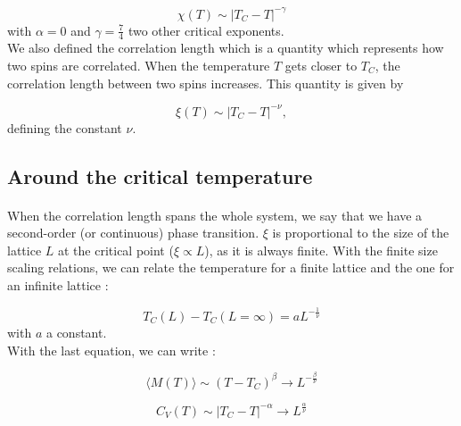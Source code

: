 \documentclass[a4paper, twoside, 11pt]{report}
\theoremstyle{theorem}
\theoremstyle{remark}
\theoremstyle{exemple}
\begin{document}
                \begin{equation*}
                    \chi(T) \sim |T_C - T |^{-\gamma}
                \end{equation*}
            with $\displaystyle \alpha = 0$ and $\displaystyle \gamma=\frac{7}{4}$ two other critical exponents.\\
            We also defined the correlation length which is a quantity which represents how two spins are correlated. When the temperature $T$ gets closer to $T_C$, the correlation length between two spins increases. This quantity is given by 
            
                \begin{equation*}
                    \xi (T) \sim |T_C - T |^{-\nu},
                \end{equation*}
            defining the constant $\nu$.
            
        \subsection{Around the critical temperature}            
            
            \paragraph{}When the correlation length spans the whole system, we say that we have a second-order (or continuous) phase transition. $\xi$ is proportional to the size of the lattice $L$ at the critical point ($\xi \propto L$), as it is always finite. With the finite size scaling relations, we can relate the temperature for a finite lattice and the one for an infinite lattice :
            
                \begin{equation*}
                    T_C(L) - T_C (L=\infty) = aL^{-\frac{1}{\nu}}
                \end{equation*}
            with $a$ a constant.\\
            With the last equation, we can write :
            
                \begin{equation*}
                    \langle M(T) \rangle \sim (T-T_C)^{\beta} \rightarrow L^{-\frac{\beta}{\nu}}
                \end{equation*}
                
                \begin{equation*}
                    C_V(T) \sim |T_C -T|^{-\alpha} \rightarrow L^{\frac{\alpha}{\nu}}
                \end{equation*}
                
\end{document}
